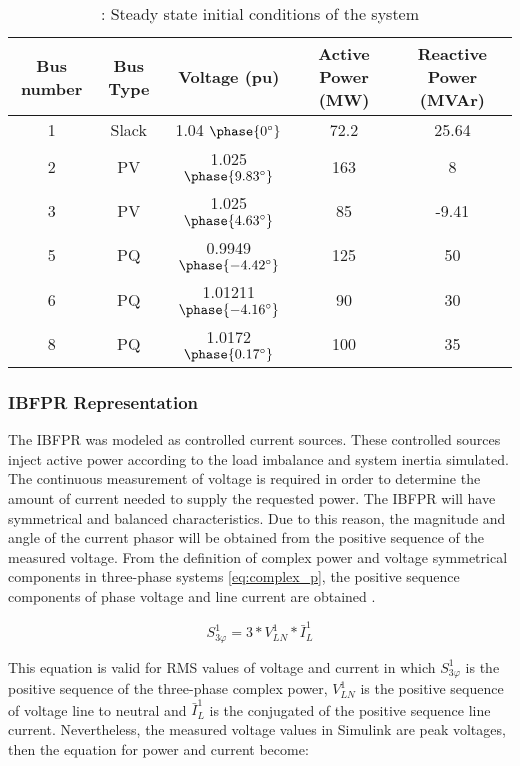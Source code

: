 \begin{table}[h]
\caption{\label{tb:initial}: Steady state initial conditions of the system}
\centering
\begin{tabular}{ccccc}
\toprule
\textbf{Bus number}	& \textbf{Bus Type}	& \textbf{Voltage (pu)}& \textbf{Active Power (MW)}& \textbf{Reactive Power (MVAr)}\\
\midrule
1 & Slack & 1.04 $\phase{0^{\circ}} $ & 72.2 & 25.64 \\
2 & PV & 1.025 $\phase{9.83^{\circ}} $ & 163 & 8 \\
3 & PV & 1.025 $\phase{4.63^{\circ}} $ & 85 & -9.41 \\
5 & PQ & 0.9949 $\phase{-4.42^{\circ}} $ &125 & 50 \\
6 & PQ & 1.01211 $\phase{-4.16^{\circ}} $ & 90 & 30 \\
8 & PQ & 1.0172 $ \phase{0.17^{\circ}} $ & 100 & 35 \\

\bottomrule
\end{tabular}
\end{table}


\subsubsection{IBFPR Representation}


The IBFPR was modeled as controlled current sources. These controlled sources inject active power according to the load imbalance and system inertia simulated. The continuous measurement of voltage is required in order to determine the amount of current needed to supply the requested power. The IBFPR will have symmetrical and balanced characteristics. Due to this reason, the magnitude and angle of the current phasor will be obtained from the positive sequence of the measured voltage. From the definition of complex power and voltage symmetrical components in three-phase systems \eqref{eq:complex_p}, the positive sequence components of phase voltage and line current are obtained \cite{john1994power}.

\begin{equation}
\label{eq:complex_p}
S_{3\varphi}^1=3*V_{LN}^1*\bar{I}_{L}^1
\end{equation}

This equation is valid for RMS values of voltage and current in which $ S_{3\varphi}^1 $ is the positive sequence of the three-phase complex power, $ V_{LN}^1 $ is the positive sequence of voltage line to neutral and $ \bar I_{L}^1 $ is the conjugated of the positive sequence line current. Nevertheless, the measured voltage values in Simulink are peak voltages, then the equation for power and current become:

